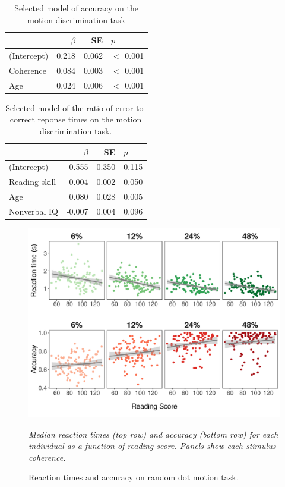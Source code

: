 \documentclass[..\uwthesis.tex]{subfiles}
\begin{document}
\begin{table}
\centering
\caption{Selected model of accuracy on the motion discrimination task}
\label{tab:sb_accmodel}
    \begin{tabular}{lrrl}
    \toprule
      & $\beta$ & SE & $p$\\
    \midrule
    (Intercept)   & 0.218 & 0.062 & $<$ 0.001\\
    Coherence     & 0.084 & 0.003 & $<$ 0.001\\
    Age           & 0.024 & 0.006 & $<$ 0.001\\
    \bottomrule
    \end{tabular}
\end{table}

\begin{table}
\centering
\caption{Selected model of the ratio of error-to-correct reponse times on the motion discrimination task.}
\label{tab:sb_ratio}
    \begin{tabular}{lrrl}
    \toprule
      & $\beta$ & SE & $p$\\
    \midrule
    (Intercept)      & 0.555  & 0.350 & 0.115\\
    Reading skill    & 0.004  & 0.002 & 0.050\\
    Age              & 0.080  & 0.028 & 0.005\\
    Nonverbal IQ     & -0.007 & 0.004 & 0.096\\
    \bottomrule
    \end{tabular}
\end{table}



\begin{figure}
    \centering
    \caption{Reaction times and accuracy on random dot motion task.}
    \label{fig:suppb_1}
    \includegraphics[width = 16 cm]{images/appendix_b/S1_Figure.png}
    \item \textit{Median reaction times (top row) and accuracy (bottom row) for each individual as a function of reading score. Panels show each stimulus coherence.}
\end{figure}
\end{document}
